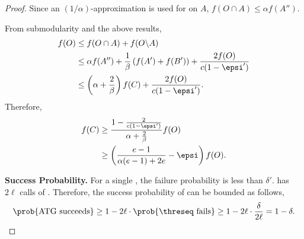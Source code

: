 \begin{proof}
  Since an $(1/\alpha)$-approximation is used for \unc on $A$,
  $f(O\cap A) \le \alpha f(A'').$

  From submodularity and the above results,
  \begin{align*}
    f(O)&\le f(O\cap A) + f(O\backslash A)\\
    &\le \alpha f(A'')+\frac{1}{\beta}\left(f(A')+f(B')\right)+\frac{2f(O)}{c(1-\epsi')}\\
    &\le \left(\alpha+\frac{2}{\beta}\right)f(C) + \frac{2f(O)}{c(1-\epsi')}.
  \end{align*}
  Therefore,
  \begin{align*}
    f(C)&\ge \frac{1-\frac{2}{c(1-\epsi')}}{\alpha+\frac{2}{\beta}}f(O)\\
    &\ge \left(\frac{e-1}{\alpha(e-1)+2e}-\epsi\right)f(O).
  \end{align*}

  \textbf{Success Probability.}
  For a single \threseq, the failure probability is less than $\delta'$.
  \adaptg has $2\ell$ calls of \threseq.
  Therefore, the success probability of \adaptg can be bounded as follows,
  $$\prob{\text{ATG succeeds}}\ge 1-2\ell\cdot \prob{\threseq \text{ fails}}\ge 
  1-2\ell \cdot \frac{\delta}{2\ell}=1-\delta.$$

\end{proof}
  